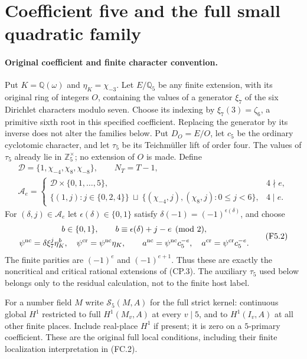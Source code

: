\section{Coefficient five and the full small quadratic family}
\label{sec:coefficient-five-small-quadratic}

\paragraph{Original coefficient and finite character convention.}
Put $K=\mathbb Q(\omega)$ and $\eta_K=\chi_{-3}$.
Let $E/\mathbb Q_5$ be any finite extension, with its original
ring of integers $O$, containing the values of a generator
$\xi_7$ of the six Dirichlet characters modulo seven.
Choose its indexing by $\xi_7(3)=\zeta_6$, a primitive sixth
root in this specified coefficient. Replacing the generator
by its inverse does not alter the families below.
Put $D_O=E/O$, let $c_5$ be the ordinary cyclotomic character,
and let $\tau_5$ be its Teichm\"uller lift of order four.
The values of $\tau_5$ already lie in $\mathbb Z_5^\times$;
no extension of $O$ is made. Define
\[
 \begin{gathered}
 \mathcal D=\{1,\chi_{-4},\chi_8,\chi_{-8}\},\qquad N_T=T-1,\\
 \mathcal A_e=\begin{cases}
       \mathcal D\times\{0,1,\ldots,5\},&4\nmid e,\\
       \{(1,j):j\in\{0,2,4\}\}\ \sqcup\
       \{(\chi_{-4},j),(\chi_8,j):0\leq j<6\},&4\mid e.
                  \end{cases}
 \end{gathered}\tag{F5.1}
\]
For $(\delta,j)\in\mathcal A_e$ let
$\epsilon(\delta)\in\{0,1\}$ satisfy
$\delta(-1)=(-1)^{\epsilon(\delta)}$, and choose
\[
 \begin{gathered}
 b\in\{0,1\},\qquad b\equiv\epsilon(\delta)+j-e\pmod2,\\
 \psi^{\rm nc}=\delta\xi_7^j\eta_K^b,\quad
 \psi^{\rm cr}=\psi^{\rm nc}\eta_K,\qquad
 a^{\rm nc}=\psi^{\rm nc}c_5^{-e},\quad
 a^{\rm cr}=\psi^{\rm cr}c_5^{-e}.
 \end{gathered}\tag{F5.2}
\]
The finite parities are $(-1)^e$ and $(-1)^{e+1}$.
Thus these are exactly the noncritical and critical rational
extensions of (CP.3). The auxiliary $\tau_5$ used below belongs
only to the residual calculation, not to the finite host label.

For a number field $M$ write $\mathcal S_5(M,A)$ for the full
strict kernel: continuous global $H^1$ restricted to full
$H^1(M_v,A)$ at every $v\mid5$, and to $H^1(I_v,A)$ at all
other finite places. Include real-place $H^1$ if present;
it is zero on a $5$-primary coefficient. These are the
original full local conditions, including their finite
localization interpretation in (FC.2).

